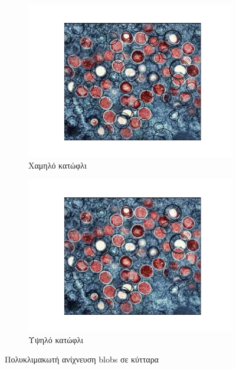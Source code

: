 \documentclass{article}
\newcommand{\eng}[1]{\foreignlanguage{english}{#1}}
\begin{document}
\begin{figure}[h]
    \centering
    \begin{subfigure}{\textwidth}
    \centering
    \includegraphics[width=\textwidth]{../image-plots/blob-detection-multiscale-cells-bad.jpg}
    \caption{Χαμηλό κατώφλι}
    \label{fig:cells-multiscale-bad}
    \end{subfigure}
    \begin{subfigure}{\textwidth}
    \centering
    \includegraphics[width=\textwidth]{../image-plots/blob-detection-multiscale-cells-good.jpg}
    \caption{Υψηλό κατώφλι}
    \label{fig:cells-multiscale-good}
    \end{subfigure}
    \caption{Πολυκλιμακωτή ανίχνευση \eng{blobs} σε κύτταρα}
    \label{fig:cells-multiscale-pair}
\end{figure}
\FloatBarrier
\end{document}
